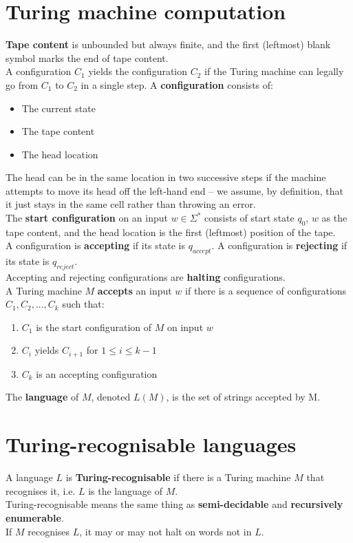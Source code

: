 \documentclass{article}
\begin{document}
\section{Turing machine computation}
\textbf{Tape content} is unbounded but always finite, and the first (leftmost) blank symbol marks the end of tape content.\medskip
\\A configuration $C_1$ yields the configuration $C_2$ if the Turing machine can legally go from $C_1$ to $C_2$ in a single step. A \textbf{configuration} consists of:
\begin{itemize}
	\item The current state
	\item The tape content
	\item The head location
\end{itemize}
The head can be in the same location in two successive steps if the machine attempts to move its head off the left-hand end -- we assume, by definition, that it just stays in the same cell rather than throwing an error.\medskip
\\The \textbf{start configuration} on an input $w \in \Sigma^*$ consists of start state $q_0$, $w$ as the tape content, and the head location is the first (leftmost) position of the tape.\medskip
\\A configuration is \textbf{accepting} if its state is $q_{accept}$. A configuration is \textbf{rejecting} if its state is $q_{reject}$.\medskip
\\Accepting and rejecting configurations are \textbf{halting} configurations.\medskip
%
\\ A Turing machine $M$ \textbf{accepts} an input $w$ if there is a sequence of configurations $C_1, C_2, ..., C_k$ such that:
\begin{enumerate}
	\item $C_1$ is the start configuration of $M$ on input $w$
	\item $C_i$ yields $C_{i+1}$ for $1 \leq i \leq k-1$
	\item $C_k$ is an accepting configuration
\end{enumerate}\medskip
The \textbf{language} of $M$, denoted $L(M)$, is the set of strings accepted by M.

\section{Turing-recognisable languages}
A language $L$ is \textbf{Turing-recognisable} if there is a Turing machine $M$ that recognises it, i.e. $L$ is the language of $M$.
\\Turing-recognisable means the same thing as \textbf{semi-decidable} and \textbf{recursively enumerable}.\medskip
\\ If $M$ recognises $L$, it may or may not halt on words not in $L$.
\end{document}
